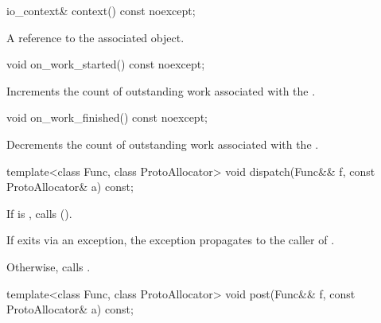 %
\begin{itemdecl}
io_context& context() const noexcept;
\end{itemdecl}

\begin{itemdescr}
\pnum
\returns A reference to the associated  object.
\end{itemdescr}

%
\begin{itemdecl}
void on_work_started() const noexcept;
\end{itemdecl}

\begin{itemdescr}
\pnum
\effects Increments the count of outstanding work associated with the .
\end{itemdescr}

%
\begin{itemdecl}
void on_work_finished() const noexcept;
\end{itemdecl}

\begin{itemdescr}
\pnum
\effects Decrements the count of outstanding work associated with the .
\end{itemdescr}

%
\begin{itemdecl}
template<class Func, class ProtoAllocator>
  void dispatch(Func&& f, const ProtoAllocator& a) const;
\end{itemdecl}

\begin{itemdescr}
\pnum
\effects If  is , calls  (). \begin{note} If  exits via an exception, the exception propagates to the caller of . \end{note} Otherwise, calls .
\end{itemdescr}

%
\begin{itemdecl}
template<class Func, class ProtoAllocator>
  void post(Func&& f, const ProtoAllocator& a) const;
\end{itemdecl}

